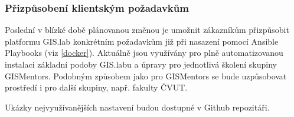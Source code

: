 \subsubsection{Přizpůsobení klientským požadavkům}
Poslední v blízké době plánovanou změnou je umožnit zákazníkům
přizpůsobit platformu GIS.lab konkrétním požadavkům již při nasazení
pomocí Ansible Playbooks (viz \ref{docker}). Aktuálně jsou využívány
pro plně automatizovanou instalaci základní podoby GIS.labu a úpravy
pro jednotlivá školení skupiny GISMentors. Podobným způsobem jako pro
GISMentors se bude uzpůsobovat prostředí i pro další skupiny,
např. fakulty ČVUT.

Ukázky nejvyužívanějších nastavení budou dostupné v Github
repozitáři.

